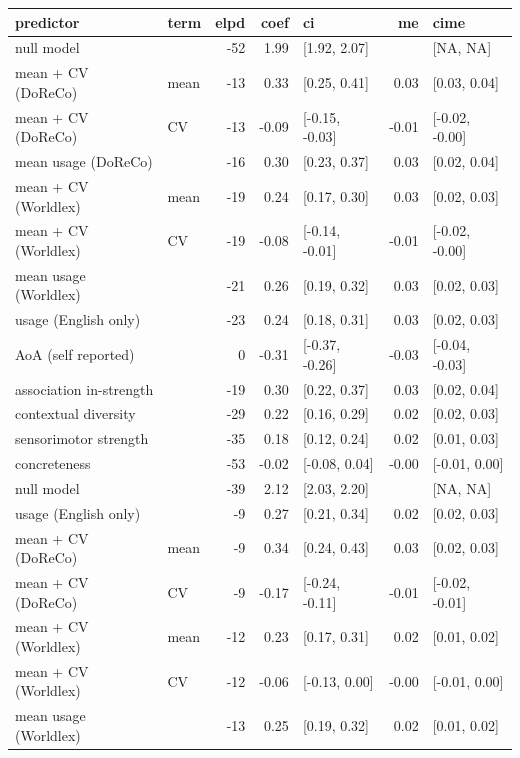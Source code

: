 \begin{table}[ht]
\centering
\begin{tabular}{llrrlrl}
  \hline
predictor & term & elpd & coef & ci & me & cime \\ 
  \hline
null model &  & -52 & 1.99 & [1.92, 2.07] &  & [NA, NA] \\ 
  mean + CV (DoReCo) & mean & -13 & 0.33 & [0.25, 0.41] & 0.03 & [0.03, 0.04] \\ 
  mean + CV (DoReCo) & CV & -13 & -0.09 & [-0.15, -0.03] & -0.01 & [-0.02, -0.00] \\ 
  mean usage (DoReCo) &  & -16 & 0.30 & [0.23, 0.37] & 0.03 & [0.02, 0.04] \\ 
  mean + CV (Worldlex) & mean & -19 & 0.24 & [0.17, 0.30] & 0.03 & [0.02, 0.03] \\ 
  mean + CV (Worldlex) & CV & -19 & -0.08 & [-0.14, -0.01] & -0.01 & [-0.02, -0.00] \\ 
  mean usage (Worldlex) &  & -21 & 0.26 & [0.19, 0.32] & 0.03 & [0.02, 0.03] \\ 
  usage (English only) &  & -23 & 0.24 & [0.18, 0.31] & 0.03 & [0.02, 0.03] \\ 
  AoA (self reported) &  & 0 & -0.31 & [-0.37, -0.26] & -0.03 & [-0.04, -0.03] \\ 
  association in-strength &  & -19 & 0.30 & [0.22, 0.37] & 0.03 & [0.02, 0.04] \\ 
  contextual diversity &  & -29 & 0.22 & [0.16, 0.29] & 0.02 & [0.02, 0.03] \\ 
  sensorimotor strength &  & -35 & 0.18 & [0.12, 0.24] & 0.02 & [0.01, 0.03] \\ 
  concreteness &  & -53 & -0.02 & [-0.08, 0.04] & -0.00 & [-0.01, 0.00] \\ 
  null model &  & -39 & 2.12 & [2.03, 2.20] &  & [NA, NA] \\ 
  usage (English only) &  & -9 & 0.27 & [0.21, 0.34] & 0.02 & [0.02, 0.03] \\ 
  mean + CV (DoReCo) & mean & -9 & 0.34 & [0.24, 0.43] & 0.03 & [0.02, 0.03] \\ 
  mean + CV (DoReCo) & CV & -9 & -0.17 & [-0.24, -0.11] & -0.01 & [-0.02, -0.01] \\ 
  mean + CV (Worldlex) & mean & -12 & 0.23 & [0.17, 0.31] & 0.02 & [0.01, 0.02] \\ 
  mean + CV (Worldlex) & CV & -12 & -0.06 & [-0.13, 0.00] & -0.00 & [-0.01, 0.00] \\ 
  mean usage (Worldlex) &  & -13 & 0.25 & [0.19, 0.32] & 0.02 & [0.01, 0.02] \\ 

\end{tabular}
\end{table}
